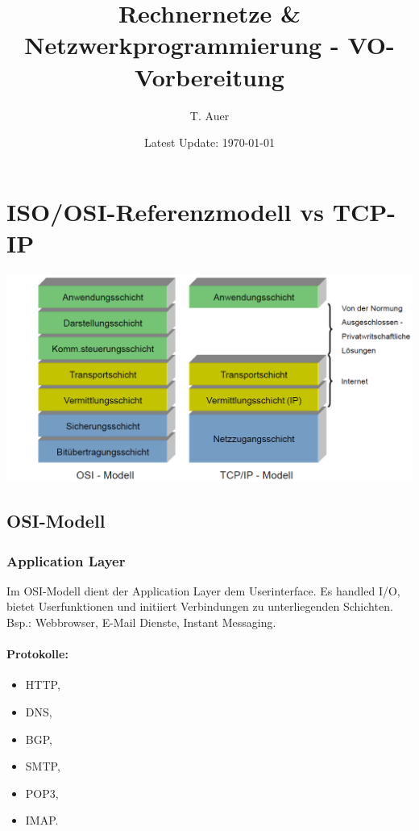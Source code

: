 \documentclass{scrartcl}
\title{Rechnernetze \& Netzwerkprogrammierung - VO-Vorbereitung}
\author{T. Auer} %
\date{Latest Update: \today}
\begin{document}
\maketitle
\hrulefill
\tableofcontents
\hrulefill
\newpage
    
\section{ISO/OSI-Referenzmodell vs TCP-IP}
    \begin{center}
        \includegraphics[width=\textwidth]{tcp_ip_model.png}
    \end{center}
    \subsection{OSI-Modell}
    \subsubsection{Application Layer}
    \label{subsubsection:OSI_application_layer}
    Im OSI-Modell dient der Application Layer dem Userinterface. Es handled I/O, bietet Userfunktionen und initiiert Verbindungen zu unterliegenden Schichten.
    Bsp.: Webbrowser, E-Mail Dienste, Instant Messaging.
    \paragraph{Protokolle:}
    \begin{itemize}
        \item HTTP,
        \item DNS,
        \item BGP, 
        \item SMTP, 
        \item POP3,
        \item IMAP.
    \end{itemize}
\end{document}
